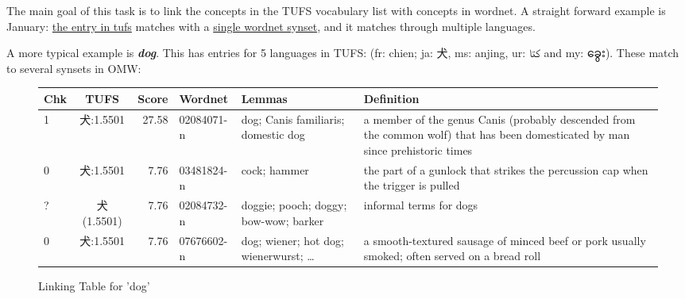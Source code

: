 \documentclass[11pt]{article}
\newcommand{\myanmar}[1]{{\myanmarfont #1}}
\newcommand{\lex}[1]{\textbf{\textit{#1}}}
\begin{document}
The main goal of this task is to link the concepts in the TUFS
vocabulary list with concepts in wordnet.  A straight forward example
is January: \href{14674}{the entry in tufs} matches with a
\href{http://compling.hss.ntu.edu.sg/omw/cgi-bin/wn-gridx.cgi?usrname=&gridmode=grid&synset=15210045-n&lang=eng&lang2=eng}{single
  wordnet synset}, and it matches through multiple languages.

A more typical example is \lex{dog}.  This has entries for 5 languages
in TUFS: (fr: chien; ja: 犬, ms: anjing, ur: \texturdu{کتا} and my: \myanmar{ခွေး}).  
These match to several synsets in OMW: 

\begin{figure}[htpb]
  \centering
\begin{tabular}{lcrlp{3cm}p{5cm}}
Chk &     TUFS & Score & Wordnet & Lemmas & Definition \\ \hline
1 &    犬:1.5501 &  27.58 & 02084071-n & dog; Canis familiaris;
                                           domestic dog & 	a member of
                                                          the genus Canis
                                                          (probably
                                                          descended from
                                                          the common wolf)
                                                          that has been
                                                          domesticated by
                                                          man since
                                                          prehistoric
                                                          times  \\
 0 &   犬:1.5501 &  7.76 & 03481824-n &  cock; hammer &	the part of a gunlock that strikes the percussion cap when the trigger is pulled\\
  ? &  犬 (1.5501) & 7.76 & 02084732-n & doggie; pooch; doggy; bow-wow;
                                          barker &	informal terms for dogs		\\
  0 &  犬:1.5501 &  7.76 & 07676602-n &dog; wiener; hot dog;
                                             wienerwurst; \ldots
                                             & a smooth-textured sausage of minced beef or pork usually smoked; often served on a bread roll	\\
  \end{tabular}
  
  \caption{Linking Table for 'dog'}
  \label{fig:linking}
\end{figure}
\end{document}
